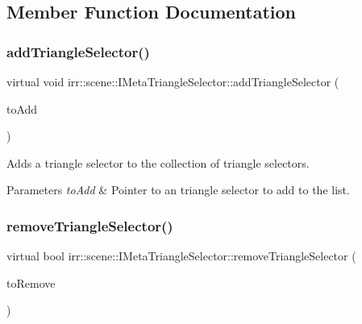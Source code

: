 \subsection{Member Function Documentation}
\mbox{\label{classirr_1_1scene_1_1IMetaTriangleSelector_afb19b5f7cbf37d202b09c126417f9a83}} 
\subsubsection{\texorpdfstring{add\+Triangle\+Selector()}{addTriangleSelector()}}
{\footnotesize\ttfamily virtual void irr\+::scene\+::\+I\+Meta\+Triangle\+Selector\+::add\+Triangle\+Selector (\begin{DoxyParamCaption}\item[{\hyperlink{classirr_1_1scene_1_1ITriangleSelector}{I\+Triangle\+Selector} $\ast$}]{to\+Add }\end{DoxyParamCaption})\hspace{0.3cm}{\ttfamily [pure virtual]}}



Adds a triangle selector to the collection of triangle selectors. 


\begin{DoxyParams}{Parameters}
{\em to\+Add} & Pointer to an triangle selector to add to the list. \\
\hline
\end{DoxyParams}
\mbox{\label{classirr_1_1scene_1_1IMetaTriangleSelector_ac1534f0bb8bb24a196ae262f3a80f32d}} 
\subsubsection{\texorpdfstring{remove\+Triangle\+Selector()}{removeTriangleSelector()}}
{\footnotesize\ttfamily virtual bool irr\+::scene\+::\+I\+Meta\+Triangle\+Selector\+::remove\+Triangle\+Selector (\begin{DoxyParamCaption}\item[{\hyperlink{classirr_1_1scene_1_1ITriangleSelector}{I\+Triangle\+Selector} $\ast$}]{to\+Remove }\end{DoxyParamCaption})\hspace{0.3cm}{\ttfamily [pure virtual]}}



